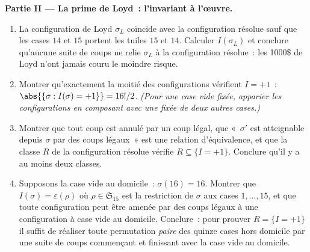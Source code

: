 \begin{problem}
\medskip
\noindent\textbf{Partie II --- La prime de Loyd~: l'invariant à
l'œuvre.}
\begin{enumerate}[resume]
  \item La configuration de Loyd $\sigma_L$ coïncide avec la
        configuration résolue sauf que les cases $14$ et $15$ portent
        les tuiles $15$ et $14$. Calculer $I(\sigma_L)$ et conclure
        qu'aucune suite de coups ne relie $\sigma_L$ à la
        configuration résolue~: les 1000\$ de Loyd n'ont jamais couru
        le moindre risque.
  \item Montrer qu'exactement la moitié des configurations vérifient
        $I = +1$~: $\abs{\{\sigma : I(\sigma) = +1\}} = 16!/2$.
        \emph{(Pour une case vide fixée, apparier les configurations
        en composant avec une  fixée de deux autres
        cases.)}
  \item Montrer que tout coup est annulé par un coup légal, que
        «~$\sigma'$ est atteignable depuis $\sigma$ par des coups
        légaux~» est une relation d'équivalence, et que la classe $R$
        de la configuration résolue vérifie $R \subseteq \{I = +1\}$.
        Conclure qu'il y a au moins deux classes.
  \item Supposons la case vide au domicile~: $\sigma(16) = 16$.
        Montrer que $I(\sigma) = \varepsilon(\rho)$ où $\rho \in
        \mathfrak{S}_{15}$ est la restriction de $\sigma$ aux cases
        $1, \dots, 15$, et que toute configuration peut être amenée
        par des coups légaux à une configuration à case vide au
        domicile. Conclure~: pour prouver $R = \{I = +1\}$ il suffit
        de réaliser toute permutation \emph{paire} des quinze cases
        hors domicile par une suite de coups commençant et finissant
        avec la case vide au domicile.
\end{enumerate}


\end{problem}
